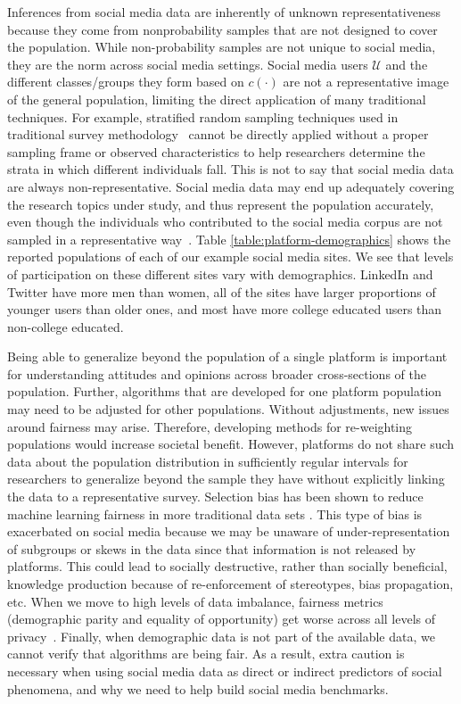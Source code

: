 \documentclass[11pt]{article} %
\begin{document}
Inferences from social media data are inherently of unknown representativeness because they come from nonprobability samples that are not designed to cover the population. While non-probability samples are not unique to social media, they are the norm across social media settings. Social media users $\mathcal{U}$ and the different classes/groups they form based on $c(\cdot)$ are not a representative image of the general population, limiting the direct application of many traditional techniques. For example, stratified random sampling techniques used in traditional survey methodology~\cite{deleeuw2008} cannot be directly applied without a proper sampling frame or observed characteristics to help researchers determine the strata in which different individuals fall. This is not to say that social media data are always non-representative. Social media data may end up adequately covering the research topics under study, and thus represent the population accurately, even though the individuals who contributed to the social media corpus are not sampled in a representative way~\cite{schober2016}.
Table \ref{table:platform-demographics} shows the reported populations of each of our example social media sites.  We see that levels of participation on these different sites vary with demographics. LinkedIn and Twitter have more men than women, all of the sites have larger proportions of younger users than older ones, and most have more college educated users than non-college educated.  

Being able to generalize beyond the population of a single platform is important for understanding attitudes and opinions across broader cross-sections of the population. Further, algorithms that are developed for one platform population may need to be adjusted for other populations. Without adjustments, new issues around fairness may arise. Therefore, developing methods for re-weighting populations would increase societal benefit. However, platforms do not share such data about the population distribution in sufficiently regular intervals for researchers to generalize beyond the sample they have without explicitly linking the data to a representative survey. Selection bias has been shown to reduce machine learning fairness in more traditional data sets \cite{suresh2020framework,Kamiran2011DataPT}. This type of bias is exacerbated on social media because we may be unaware of under-representation of subgroups or skews in the data since that information is not released by platforms. This could lead to socially destructive, rather than socially beneficial, knowledge production because of re-enforcement of stereotypes, bias propagation, etc. When we move to high levels of data imbalance, fairness metrics (demographic parity and equality of opportunity) get worse across all levels of privacy~\cite{farrand2020}. Finally, when demographic data is not part of the available data, we cannot verify that algorithms are being fair. As a result, extra caution is necessary when using social media data as direct \cite{de2013predicting} or indirect \cite{10.1145/3292500.3330774}  predictors of social phenomena, and why we need to help build social media benchmarks. 
\end{document}
